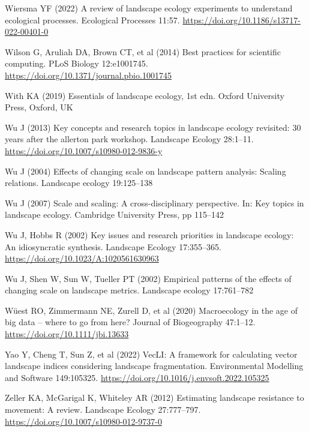 \documentclass[
  10pt,
  a4paperpaper,
]{article}
\newlength{\cslhangindent}
\newenvironment{CSLReferences}[2] %
 {\begin{list}{}{%
  \setlength{\itemindent}{0pt}
  \setlength{\leftmargin}{0pt}
  \setlength{\parsep}{0pt}
  \ifodd #1
   \setlength{\leftmargin}{\cslhangindent}
   \setlength{\itemindent}{-1\cslhangindent}
  \fi
  \setlength{\itemsep}{#2\baselineskip}}}
 {\end{list}}
\begin{document}
\begin{CSLReferences}{1}{1}
Wiersma YF (2022) A review of landscape ecology experiments to
understand ecological processes. Ecological Processes 11:57.
\url{https://doi.org/10.1186/s13717-022-00401-0}

Wilson G, Aruliah DA, Brown CT, et al (2014) Best practices for
scientific computing. PLoS Biology 12:e1001745.
\url{https://doi.org/10.1371/journal.pbio.1001745}

With KA (2019) Essentials of landscape ecology, 1st edn. Oxford
University Press, Oxford, UK

Wu J (2013) Key concepts and research topics in landscape ecology
revisited: 30 years after the allerton park workshop. Landscape Ecology
28:1--11. \url{https://doi.org/10.1007/s10980-012-9836-y}

Wu J (2004) Effects of changing scale on landscape pattern analysis:
Scaling relations. Landscape ecology 19:125--138

Wu J (2007) Scale and scaling: A cross-disciplinary perspective. In: Key
topics in landscape ecology. Cambridge University Press, pp 115--142

Wu J, Hobbs R (2002) Key issues and research priorities in landscape
ecology: An idiosyncratic synthesis. Landscape Ecology 17:355--365.
\url{https://doi.org/10.1023/A:1020561630963}

Wu J, Shen W, Sun W, Tueller PT (2002) Empirical patterns of the effects
of changing scale on landscape metrics. Landscape ecology 17:761--782

Wüest RO, Zimmermann NE, Zurell D, et al (2020) Macroecology in the age
of big data -- where to go from here? Journal of Biogeography 47:1--12.
\url{https://doi.org/10.1111/jbi.13633}

Yao Y, Cheng T, Sun Z, et al (2022) VecLI: A framework for calculating
vector landscape indices considering landscape fragmentation.
Environmental Modelling and Software 149:105325.
\url{https://doi.org/10.1016/j.envsoft.2022.105325}

Zeller KA, McGarigal K, Whiteley AR (2012) Estimating landscape
resistance to movement: A review. Landscape Ecology 27:777--797.
\url{https://doi.org/10.1007/s10980-012-9737-0}


\end{CSLReferences}
\end{document}
